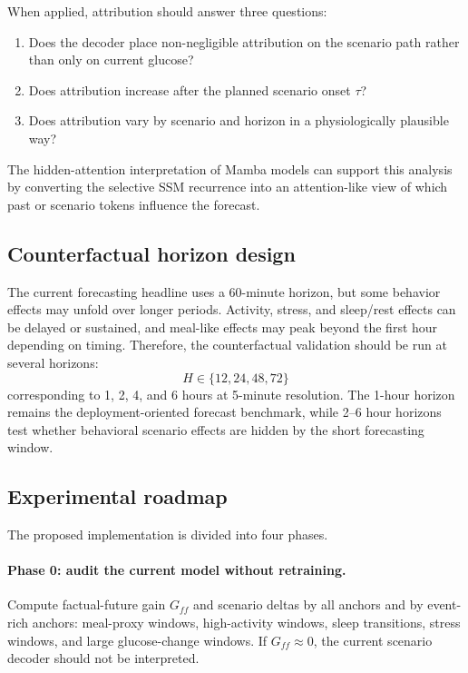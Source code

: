 When applied, attribution should answer three questions:
\begin{enumerate}
    \item Does the decoder place non-negligible attribution on the scenario path rather than only on current glucose?
    \item Does attribution increase after the planned scenario onset $\tau$?
    \item Does attribution vary by scenario and horizon in a physiologically plausible way?
\end{enumerate}
The hidden-attention interpretation of Mamba models can support this analysis by converting the selective SSM recurrence into an attention-like view of which past or scenario tokens influence the forecast.

\subsection{Counterfactual horizon design}
\label{subsec:horizon_design}

The current forecasting headline uses a 60-minute horizon, but some behavior effects may unfold over longer periods. Activity, stress, and sleep/rest effects can be delayed or sustained, and meal-like effects may peak beyond the first hour depending on timing. Therefore, the counterfactual validation should be run at several horizons:
\begin{equation}
    H \in \{12,24,48,72\}
\end{equation}
corresponding to 1, 2, 4, and 6 hours at 5-minute resolution. The 1-hour horizon remains the deployment-oriented forecast benchmark, while 2--6 hour horizons test whether behavioral scenario effects are hidden by the short forecasting window.

\subsection{Experimental roadmap}
\label{subsec:cf_experimental_roadmap}

The proposed implementation is divided into four phases.

\paragraph{Phase 0: audit the current model without retraining.}
Compute factual-future gain $G_{ff}$ and scenario deltas by all anchors and by event-rich anchors: meal-proxy windows, high-activity windows, sleep transitions, stress windows, and large glucose-change windows. If $G_{ff}\approx 0$, the current scenario decoder should not be interpreted.

